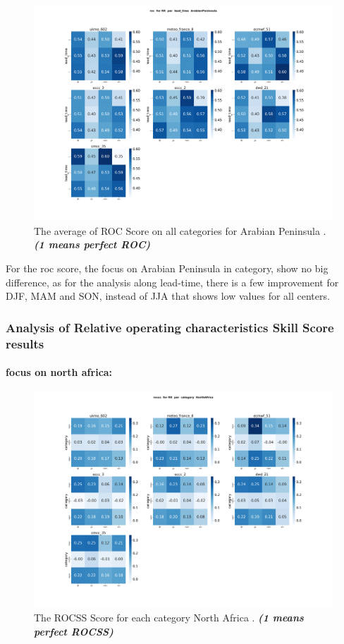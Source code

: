\begin{figure}[H]
    \centering
    \includegraphics[scale=0.25]{plots/prob/roc/roc_RR_lead_time_ArabianPeninsula.png}
    \caption{The average of  ROC Score on all categories for Arabian Peninsula . \textbf{\textit{(1 means perfect ROC)}}}
\end{figure}


For the roc score, the focus on Arabian Peninsula in category, show no big difference, as for the analysis along lead-time, there is a few improvement for DJF, MAM and SON, instead of JJA that shows low values for all centers. 													\subsubsection{Analysis of Relative operating characteristics Skill Score results }
\paragraph{focus on north africa:}
\begin{figure}[H]
    \centering
    \includegraphics[scale=0.25]{plots/prob/rocss/rocss_RR_category_NorthAfrica.png}
    \caption{The ROCSS Score for each category North Africa . \textbf{\textit{(1 means perfect ROCSS)}}}
\end{figure}


